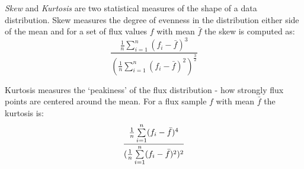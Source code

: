 	\emph{Skew} and \emph{Kurtosis} are two statistical measures of the shape of a data distribution. Skew measures the degree of evenness in the distribution either side of the mean and for a set of flux values $f$ with mean $\bar{f}$ the skew is computed as:
	\begin{equation}
		\frac{\frac{1}{n}\sum\limits^{n}_{i=1}(f_{i} - \bar{f})^{3}}
		{(\frac{1}{n}\sum\limits^{n}_{i=1}(f_{i} - \bar{f})^{2})^{\frac{3}{2}}}
	\end{equation}
	
	Kurtosis measures the `peakiness' of the flux distribution - how strongly flux points are centered around the mean. For a flux sample $f$ with mean $\bar{f}$ the kurtosis is:
	\begin{equation}
		\frac{\frac{1}{n}\sum\limits^{n}_{i=1}(f_{i} - \bar{f})^{4}}
		{(\frac{1}{n}\sum\limits^{n}_{i=1}(f_{i} - \bar{f})^{2})^{2}} \\
	\end{equation}
	
